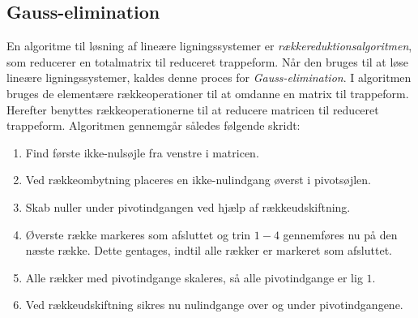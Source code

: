 \subsection{Gauss-elimination}
\label{gauss}
En algoritme til løsning af lineære ligningssystemer er  \textit{rækkereduktionsalgoritmen}, som reducerer en totalmatrix til reduceret trappeform.
Når den bruges til at løse lineære ligningssystemer, kaldes denne proces for \textit{Gauss-elimination}.
I algoritmen bruges de elementære rækkeoperationer til at omdanne en matrix til trappeform. 
Herefter benyttes rækkeoperationerne til at reducere matricen til reduceret trappeform.
Algoritmen gennemgår således følgende skridt:
%
\begin{enumerate}
\item Find første ikke-nulsøjle fra venstre i matricen.
\item Ved rækkeombytning placeres en ikke-nulindgang øverst i pivotsøjlen.
\item Skab nuller under pivotindgangen ved hjælp af rækkeudskiftning.
\item Øverste række markeres som afsluttet og trin $1-4$ gennemføres nu på den næste række.
Dette gentages, indtil alle rækker er markeret som afsluttet.
\item Alle rækker med pivotindgange skaleres, så alle pivotindgange er lig $1$.
\item Ved rækkeudskiftning sikres nu nulindgange over og under pivotindgangene.
\end{enumerate}
%
